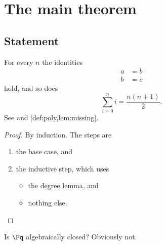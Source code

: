 \chapter{The main theorem}

\section{Statement}\label{sec:statement}

\begin{theorem}[Main]
\label{thm:main}
For every $n$ the identities
\begin{align}
  a &= b \\
  b &= c
\end{align}
hold, and so does
\begin{equation}
  \label{eq:gauss}
  \sum_{i=0}^{n} i = \frac{n(n+1)}{2}.
\end{equation}
See  and \cref{def:poly,lem:missing}.
\end{theorem}

\begin{proof}
\leanok
By induction.  The steps are
\begin{enumerate}
  \item the base case, and
  \item the inductive step, which uses
    \begin{itemize}
      \item the degree lemma, and
      \item nothing else.
    \end{itemize}
\end{enumerate}
\end{proof}

\begin{openproblem}
\label{op:open}
Is $\Fq$ algebraically closed?  Obviously not.
\end{openproblem}
